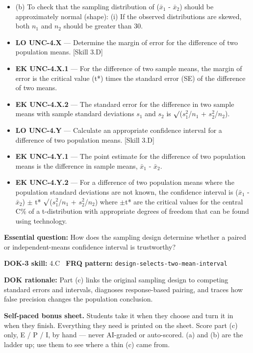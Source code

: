 \documentclass[11pt]{article}
\begin{document}
{\begin{itemize}[leftmargin=1.5em,itemsep=2pt,topsep=2pt]
  \item (b) To check that the sampling distribution of ($\bar{x}_1$ - $\bar{x}_2$) should be approximately normal (shape): (i) If the observed distributions are skewed, both $n_1$ and $n_2$ should be greater than 30.
  \item \textbf{LO UNC-4.X} --- Determine the margin of error for the difference of two population means. [Skill 3.D]
  \item \textbf{EK UNC-4.X.1} --- For the difference of two sample means, the margin of error is the critical value (t*) times the standard error (SE) of the difference of two means.
  \item \textbf{EK UNC-4.X.2} --- The standard error for the difference in two sample means with sample standard deviations $s_1$ and $s_2$ is $\surd$($s_1^2$/$n_1$ + $s_2^2$/$n_2$).
  \item \textbf{LO UNC-4.Y} --- Calculate an appropriate confidence interval for a difference of two population means. [Skill 3.D]
  \item \textbf{EK UNC-4.Y.1} --- The point estimate for the difference of two population means is the difference in sample means, $\bar{x}_1$ - $\bar{x}_2$.
  \item \textbf{EK UNC-4.Y.2} --- For a difference of two population means where the population standard deviations are not known, the confidence interval is ($\bar{x}_1$ - $\bar{x}_2$) $\pm$ t* $\surd$($s_1^2$/$n_1$ + $s_2^2$/$n_2$) where $\pm$t* are the critical values for the central C\% of a t-distribution with appropriate degrees of freedom that can be found using technology.
\end{itemize}
}
\textbf{Essential question:} How does the sampling design determine whether a paired or independent-means confidence interval is trustworthy?\par
\textbf{DOK-3 skill:} 4.C \textperiodcentered\ \textbf{FRQ pattern:} {\small\texttt{design-\allowbreak{}selects-\allowbreak{}two-\allowbreak{}mean-\allowbreak{}interval}}\par
\textbf{DOK rationale:} Part (c) links the original sampling design to competing standard errors and intervals, diagnoses response-based pairing, and traces how false precision changes the population conclusion.\par

\textbf{Self-paced bonus sheet.} Students take it when they choose and turn it in when they finish. Everything they need is printed on the sheet. Score part (c) only, E / P / I, by hand --- never AI-graded or auto-scored. (a) and (b) are the ladder up; use them to see where a thin (c) came from.\par
\end{document}
